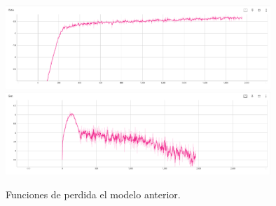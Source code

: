 \begin{figure}
    \centering
    \includegraphics[width=100mm,scale=0.5]{Figures/res/CWGANGP_LD4_R4/criticloss.png}
    \includegraphics[width=100mm,scale=0.5]{Figures/res/CWGANGP_LD4_R4/genloss.png}
    \decoRule
    \caption[Perdidas 0]{
        Funciones de perdida el modelo anterior.
    }
    \label{fig:ld4r0losses}
\end{figure}





% 